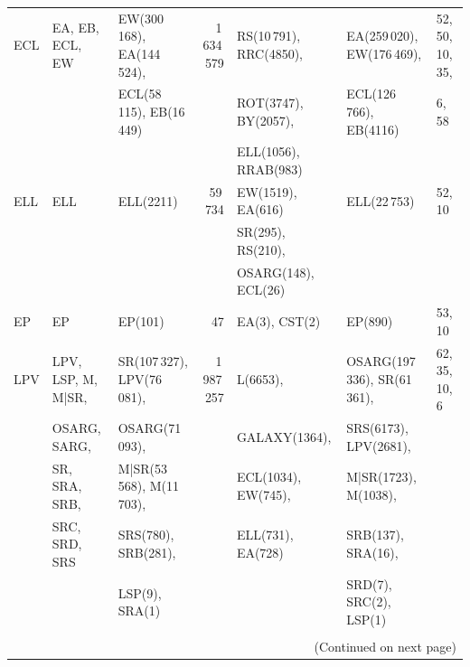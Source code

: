 \documentclass[longauth]{aa}
\begin{document}
\begin{landscape}
\begin{table}
\begin{tabular}{@{}lllrlll@{}}
ECL & EA, EB, ECL, EW & EW(300\,168), EA(144\,524), & 1\,634\,579 & RS(10\,791), RRC(4850), & EA(259\,020), EW(176\,469), & 52, 50, 10, 35, \\
    &                 & ECL(58\,115), EB(16\,449) &               & ROT(3747), BY(2057), & ECL(126\,766), EB(4116) & 6, 58  \\
    &                 &                           &               & ELL(1056), RRAB(983) &  &   \\
ELL & ELL & ELL(2211) & 59\,734 & EW(1519), EA(616) & ELL(22\,753) & 52, 10  \\
    &     &           &         & SR(295), RS(210), &  &   \\
    &     &           &         & OSARG(148), ECL(26) &  &   \\
EP & EP & EP(101)  & 47 & EA(3), CST(2) & EP(890) & 53, 10  \\
LPV & LPV, LSP, M, M|SR, & SR(107\,327), LPV(76\,081), & 1\,987\,257 & L(6653),  & OSARG(197\,336), SR(61\,361), & 62, 35, 10, 6  \\
    & OSARG, SARG,   & OSARG(71\,093),  &  & GALAXY(1364), & SRS(6173), LPV(2681),  &   \\
    & SR, SRA, SRB,  & M|SR(53\,568), M(11\,703),  &  & ECL(1034), EW(745), & M|SR(1723), M(1038),  &   \\
    & SRC, SRD, SRS & SRS(780), SRB(281),   &  & ELL(731), EA(728) & SRB(137), SRA(16), &   \\
    &               & LSP(9), SRA(1)                       &  &  & SRD(7), SRC(2), LSP(1) &   \\
\hline & \\  [-2.0ex]                    
\multicolumn{7}{r}{{(Continued on next page)}} 
\end{tabular}
\end{table}  
\end{landscape}
\end{document}
